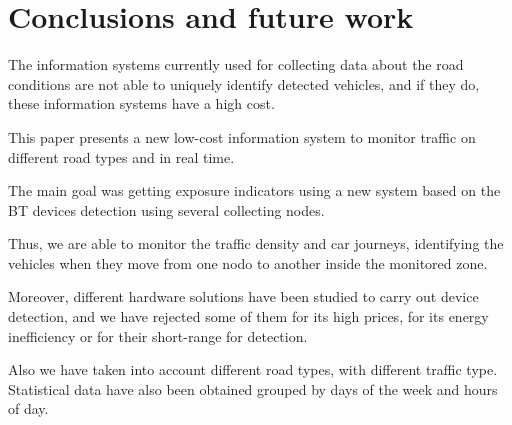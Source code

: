 \documentclass{llncs}
\begin{document}
\section{Conclusions and future work}
\label{conclus}


The information systems currently used for collecting data about the road conditions are not able to uniquely identify detected vehicles, and if they do, these information systems have a high cost.

This paper presents a new low-cost information system to monitor traffic on different road types and in real time.

The main goal was getting exposure indicators using a new system based on the BT devices detection using several collecting nodes.


Thus, we are able to monitor the traffic density and car journeys, identifying the vehicles when they move from one nodo to another inside the monitored zone.

Moreover, different hardware solutions have been studied to carry out device detection, and we have rejected some of them for its high prices, for its energy inefficiency or for their short-range for detection.


Also we have taken into account different road types, with different traffic type.
Statistical data have also been obtained grouped by days of the week and hours of day.
\end{document}
